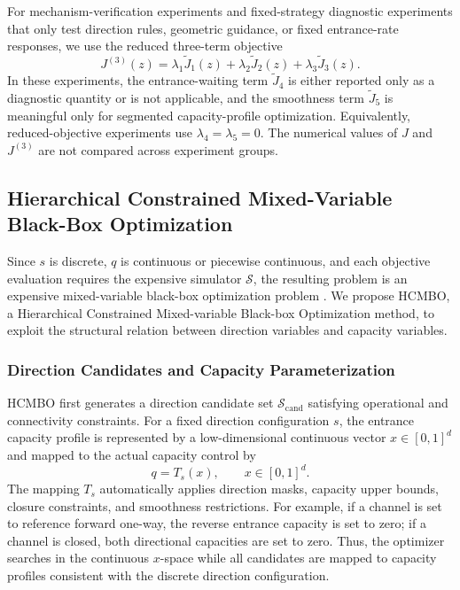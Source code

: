 \documentclass[lettersize,journal]{IEEEtran}
\begin{document}
For mechanism-verification experiments and fixed-strategy diagnostic experiments that only test direction rules, geometric guidance, or fixed entrance-rate responses, we use the reduced three-term objective
\begin{equation}
J^{(3)}(z)=
\lambda_1\tilde J_1(z)
+\lambda_2\tilde J_2(z)
+\lambda_3\tilde J_3(z).
\label{eq:reduced_objective}
\end{equation}
In these experiments, the entrance-waiting term $\tilde J_4$ is either reported only as a diagnostic quantity or is not applicable, and the smoothness term $\tilde J_5$ is meaningful only for segmented capacity-profile optimization.
Equivalently, reduced-objective experiments use $\lambda_4=\lambda_5=0$.
The numerical values of $J$ and $J^{(3)}$ are not compared across experiment groups.

\subsection{Hierarchical Constrained Mixed-Variable Black-Box Optimization}
\label{sec:optimization}

Since $s$ is discrete, $q$ is continuous or piecewise continuous, and each objective evaluation requires the expensive simulator $\mathcal S$, the resulting problem is an expensive mixed-variable black-box optimization problem \cite{sheikh2022mixed_variable_mobo,ramirez2022mixed_variables_bo,dreczkowski2023mixed_variable_bo}.
We propose HCMBO, a Hierarchical Constrained Mixed-variable Black-box Optimization method, to exploit the structural relation between direction variables and capacity variables.

\subsubsection{Direction Candidates and Capacity Parameterization}

HCMBO first generates a direction candidate set $\mathcal S_{\mathrm{cand}}$ satisfying operational and connectivity constraints.
For a fixed direction configuration $s$, the entrance capacity profile is represented by a low-dimensional continuous vector $x\in[0,1]^d$ and mapped to the actual capacity control by
\begin{equation}
q=T_s(x),\qquad x\in[0,1]^d.
\label{eq:capacity_parameterization}
\end{equation}
The mapping $T_s$ automatically applies direction masks, capacity upper bounds, closure constraints, and smoothness restrictions.
For example, if a channel is set to reference forward one-way, the reverse entrance capacity is set to zero; if a channel is closed, both directional capacities are set to zero.
Thus, the optimizer searches in the continuous $x$-space while all candidates are mapped to capacity profiles consistent with the discrete direction configuration.
\end{document}
